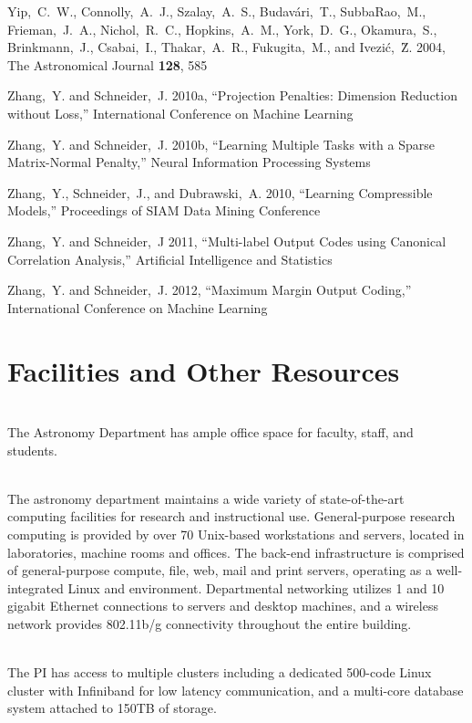 \documentclass[prd,nofootbib,floatfix,11pt,tightenlines]{revtex4}
\begin{document}
\begin{thebibliography}{99}
Yip,~C.~W., Connolly,~A.~J., Szalay,~A.~S., Budav\'ari,~T., SubbaRao,~M.,
Frieman,~J.~A., Nichol,~R.~C., Hopkins,~A.~M., York,~D.~G., Okamura,~S.,
Brinkmann,~J., Csabai,~I., Thakar,~A.~R., Fukugita,~M., 
and Ivezi\'c,~\u Z. 2004, The Astronomical Journal {\bf 128}, 585

Zhang,~Y. and Schneider,~J. 2010a, ``Projection Penalties: Dimension Reduction without
Loss,'' International Conference on Machine Learning

Zhang,~Y. and Schneider,~J. 2010b,
``Learning Multiple Tasks with a Sparse Matrix-Normal Penalty,''
Neural Information Processing Systems

Zhang,~Y., Schneider,~J., and Dubrawski,~A. 2010,
``Learning Compressible Models,'' Proceedings of SIAM Data Mining Conference

Zhang,~Y. and Schneider,~J 2011, ``Multi-label Output Codes using Canonical Correlation
Analysis,'' Artificial Intelligence and Statistics

Zhang,~Y. and Schneider,~J. 2012, ``Maximum Margin Output Coding,''
International Conference on Machine Learning

\end{thebibliography} 

\newpage

\section*{Facilities and Other Resources}

\\
The Astronomy Department has ample office
space for faculty, staff, and students. 

\\
The astronomy department maintains a wide variety of state-of-the-art
computing facilities for research and instructional use. General-purpose research computing is provided by over 70 
Unix-based workstations and servers, located in laboratories, machine rooms and offices. The
back-end infrastructure is comprised of general-purpose compute, file, web, mail and print
servers, operating as a well-integrated Linux and environment. Departmental
networking utilizes 1 and 10 gigabit Ethernet connections to servers and desktop machines, and a
wireless network provides 802.11b/g connectivity throughout the entire building.

\\
The PI has  access to multiple clusters including a dedicated 500-code Linux cluster with Infiniband for low latency
communication, and a multi-core database system attached to 150TB of
storage. 


\label{lastpage}
\end{document}

